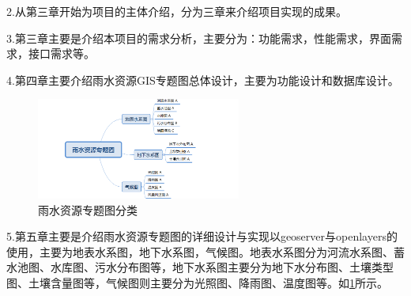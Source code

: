 2.从第三章开始为项目的主体介绍，分为三章来介绍项目实现的成果。

3.第三章主要是介绍本项目的需求分析，主要分为：功能需求，性能需求，界面需求，接口需求等。

4.第四章主要介绍雨水资源GIS专题图总体设计，主要为功能设计和数据库设计。

\begin{figure}[H]%
	\centering
	\includegraphics[width=0.60\textwidth]{figs/tree_1.png}
	\caption{雨水资源专题图分类}
	\label{fig:classify_rain}
\end{figure}

5.第五章主要是介绍雨水资源专题图的详细设计与实现以geoserver与openlayers的使用，主要为地表水系图，地下水系图，气候图。地表水系图分为河流水系图、蓄水池图、水库图、污水分布图等，地下水系图主要分为地下水分布图、土壤类型图、土壤含量图等，气候图则主要分为光照图、降雨图、温度图等。如\ref{fig:classify_rain}所示。


%

%

%
%





